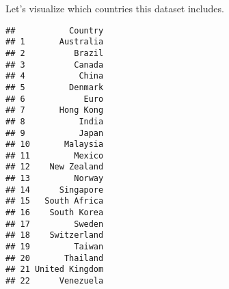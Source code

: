 \documentclass[]{article}
\newenvironment{Shaded}{\begin{snugshade}}{\end{snugshade}}
\newcommand{\KeywordTok}[1]{\textcolor[rgb]{0.13,0.29,0.53}{\textbf{#1}}}
\newcommand{\NormalTok}[1]{#1}
\newcommand{\OperatorTok}[1]{\textcolor[rgb]{0.81,0.36,0.00}{\textbf{#1}}}
\newcommand{\StringTok}[1]{\textcolor[rgb]{0.31,0.60,0.02}{#1}}
\begin{document}
Let's visualize which countries this dataset includes.

\begin{Shaded}
\end{Shaded}

\begin{verbatim}
##           Country
## 1       Australia
## 2          Brazil
## 3          Canada
## 4           China
## 5         Denmark
## 6            Euro
## 7       Hong Kong
## 8           India
## 9           Japan
## 10       Malaysia
## 11         Mexico
## 12    New Zealand
## 13         Norway
## 14      Singapore
## 15   South Africa
## 16    South Korea
## 17         Sweden
## 18    Switzerland
## 19         Taiwan
## 20       Thailand
## 21 United Kingdom
## 22      Venezuela
\end{verbatim}
\end{document}
